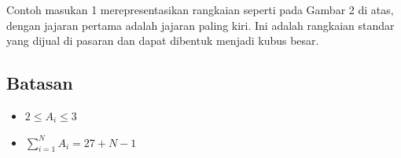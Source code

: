 \documentclass{article}
\begin{document}
\par\noindent Contoh masukan 1 merepresentasikan rangkaian seperti pada Gambar 2 di atas, dengan jajaran pertama adalah jajaran paling kiri. Ini adalah rangkaian standar yang dijual di pasaran dan dapat dibentuk menjadi kubus besar.

\subsection*{Batasan}

\begin{itemize}
	\item $2 \leq A_i \leq 3$
	\item $\sum_{i=1}^{N} A_i = 27 + N - 1$
\end{itemize}
\end{document}
